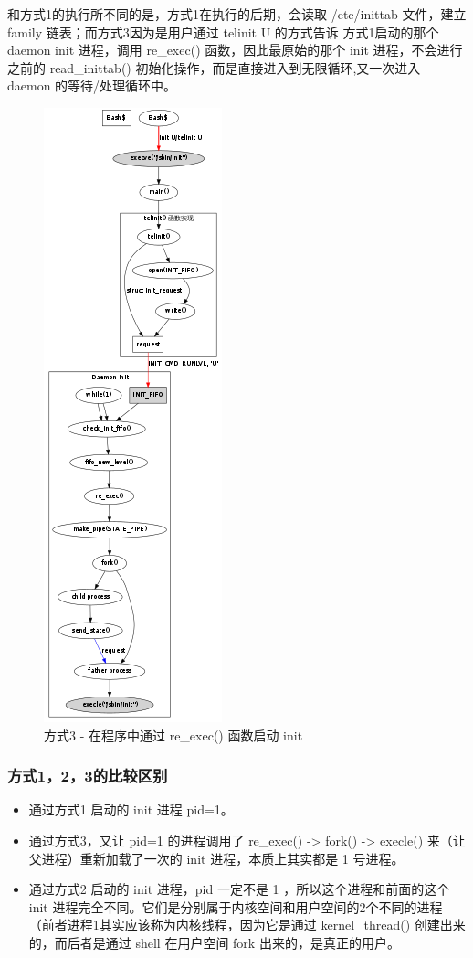 和方式1的执行所不同的是，方式1在执行的后期，会读取 /etc/inittab 文件，建立
family 链表；而方式3因为是用户通过 telinit U 的方式告诉 方式1启动的那个
daemon init 进程，调用 re\_exec() 函数，因此最原始的那个 init
进程，不会进行之前的 read\_inittab()
初始化操作，而是直接进入到无限循环,又一次进入 daemon 的等待/处理循环中。

\begin{figure}[htbp]
\centering
\includegraphics{./figures/how-to-exec-init-3.png}
\caption{方式3 - 在程序中通过 re\_exec() 函数启动 init}
\end{figure}

\subsubsection{方式1，2，3的比较区别}

\begin{itemize}
\item
  通过方式1 启动的 init 进程 pid=1。
\item
  通过方式3，又让 pid=1 的进程调用了 re\_exec() -\textgreater{} fork()
  -\textgreater{} execle() 来（让父进程）重新加载了一次的 init
  进程，本质上其实都是 1 号进程。
\item
  通过方式2 启动的 init 进程，pid 一定不是 1 ，所以这个进程和前面的这个
  init
  进程完全不同。它们是分别属于内核空间和用户空间的2个不同的进程（前者进程1其实应该称为内核线程，因为它是通过
  kernel\_thread() 创建出来的，而后者是通过 shell 在用户空间 fork
  出来的，是真正的用户。
\end{itemize}
